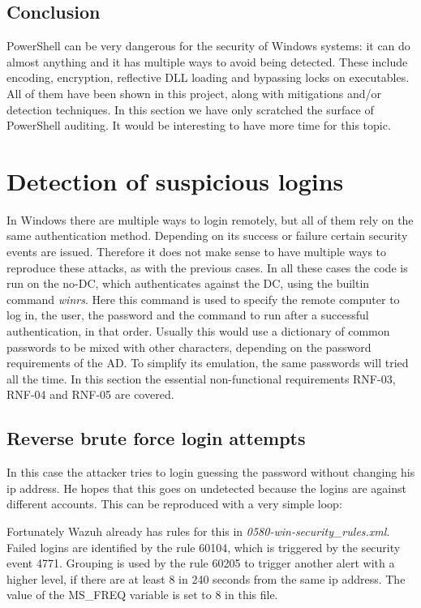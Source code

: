 \subsection{Conclusion}
PowerShell can be very dangerous for the security of Windows systems: it can do almost anything and it has multiple ways to avoid being detected.
These include encoding, encryption, reflective DLL loading and bypassing locks on executables.
All of them have been shown in this project, along with mitigations and/or detection techniques.
\linej
In this section we have only scratched the surface of PowerShell auditing. It would be interesting to have more time for this topic.

\section{Detection of suspicious logins}
In Windows there are multiple ways to login remotely, but all of them rely on the same authentication method. Depending on its success or failure certain security events are issued. Therefore it does not make sense to have multiple ways to reproduce these attacks, as with the previous cases.
\linej
In all these cases the code is run on the no-DC, which authenticates against the DC, using the builtin command \textit{winrs}\cite{winrs}. Here this command is used to specify the remote computer to log in, the user, the password and the command to run after a successful authentication, in that order.
\linej
\linej
Usually this would use a dictionary of common passwords to be mixed with other characters, depending on the password requirements of the AD.
To simplify its emulation, the same passwords will tried all the time.
\linej
\linej
In this section the essential non-functional requirements RNF-03, RNF-04 and RNF-05 are covered.

\subsection{Reverse brute force login attempts} \label{reverse_login}
In this case the attacker tries to login guessing the password without changing his ip address.
He hopes that this goes on undetected because the logins are against different accounts.
\linej
This can be reproduced with a very simple loop:

\linej
Fortunately Wazuh already has rules for this in \textit{0580-win-security\_rules.xml}\cite{wazuh_ruleset}.
Failed logins are identified by the rule 60104, which is triggered by the security event 4771\cite{windows_events}.
Grouping is used by the rule 60205 to trigger another alert with a higher level, if there are at least 8 in 240 seconds from the same ip address.
The value of the MS\_FREQ variable is set to 8 in this file.
\linej


